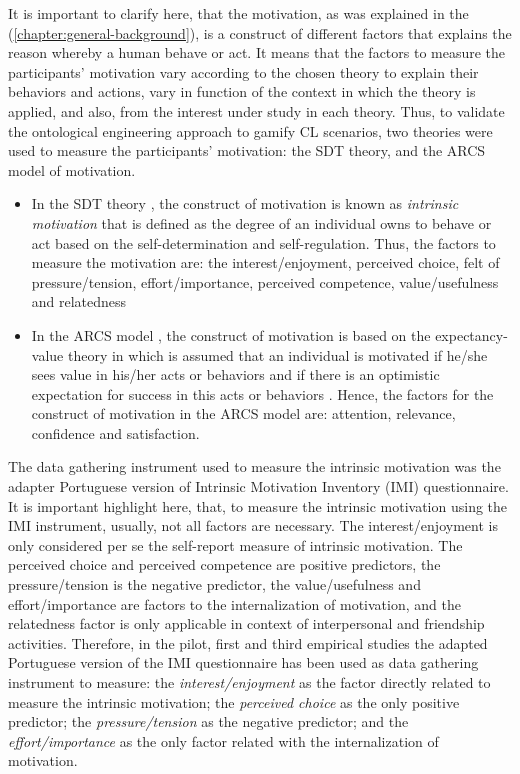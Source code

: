 It is important to clarify here, that the motivation, as was explained in the  (\autoref{chapter:general-background}), is a construct of different factors that explains the reason whereby a human behave or act.
It means that the factors to measure the participants' motivation vary according to the chosen theory to explain their behaviors and actions, vary in function of the context in which the theory is applied, and also, from the interest under study in each theory.
Thus, to validate the ontological engineering approach to gamify CL scenarios, two theories were used to measure the participants' motivation: the SDT theory, and the ARCS model of motivation.

\begin{itemize}
\item
In the SDT theory \cite{RyanDeci2000}, the construct of motivation is known as \emph{intrinsic motivation} that is defined as the degree of an individual owns to behave or act based on the self-determination and self-regulation.
Thus, the factors to measure the motivation are: the interest/enjoyment, perceived choice, felt of pressure/tension, effort/importance, perceived competence, value/usefulness and relatedness

\item
In the ARCS model \cite{Keller2009}, the construct of motivation is based on the expectancy-value theory in which is assumed that an individual is motivated if he/she sees value in his/her acts or behaviors and if there is an optimistic expectation for success in this acts or behaviors \cite{Wigfield1994}.
Hence, the factors for the construct of motivation in the ARCS model are: attention, relevance, confidence and satisfaction.
\end{itemize}

The data gathering instrument used to measure the intrinsic motivation was the adapter Portuguese version of Intrinsic Motivation Inventory (IMI) questionnaire.
It is important highlight here, that, to measure the intrinsic motivation using the IMI instrument, usually, not all factors are necessary.
The interest/enjoyment is only considered per se the self-report measure of intrinsic motivation.
The perceived choice and perceived competence are positive predictors, the pressure/tension is the negative predictor, the value/usefulness and effort/importance are factors to the internalization of motivation, and the relatedness factor is only applicable in context of interpersonal and friendship activities.
Therefore, in the pilot, first and third empirical studies the adapted Portuguese version of the IMI questionnaire has been used as data gathering instrument to measure:
the \emph{interest/enjoyment} as the factor directly related to measure the intrinsic motivation;
the \emph{perceived choice} as the only positive predictor;
the \emph{pressure/tension} as the negative predictor; and
the \emph{effort/importance} as the only factor related with the internalization of motivation.

